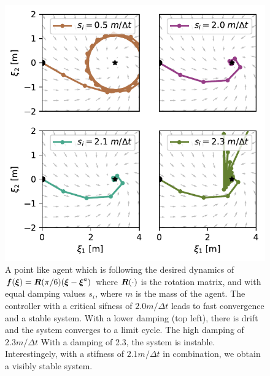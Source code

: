 \begin{figure}[htb]
\centering
  \includegraphics[width=\columnwidth]{figures/discrete_controller_parameters_comparison_stable}
\caption{A point like agent which is following the desired dynamics of
$\boldsymbol{f}(\boldsymbol{\xi}) = \boldsymbol{R}(\pi / 6) (\boldsymbol{\xi}  - \boldsymbol{\xi}^a)$ where $\boldsymbol{R}(\cdot)$ is the rotation matrix, and with equal damping values $s_i$, where $m$ is the mass of the agent.
The controller with a critical sifness of $2.0 m / \Delta t$ leads to fast convergence and a stable system. With a lower damping (top left), there is drift and the system converges to a limit cycle. The high damping of $2.3 m / \Delta t$
With a damping of 2.3, the system is instable. Interestingely, with a stifness of $2.1 m / \Delta t$ in combination, we obtain a visibly stable system.}
  \label{fig:discrete_controller_parameters_comparison_stable}
\end{figure}


% 


